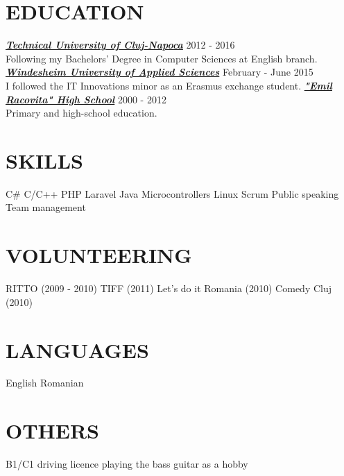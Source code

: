 \documentclass[line,margin]{res}
\begin{document}
\begin{resume}
\section{\color{section} EDUCATION}
\justify
{\color{headings}\large \sl \textbf{\href{http://www.utcluj.ro/}{Technical University of Cluj-Napoca}}} {\scriptsize 2012 - 2016} \\
Following my Bachelors' Degree in Computer Sciences at English branch.
\vspace{0.2cm}
\newline
{\color{headings}\large \sl \textbf{\href{http://www.windesheiminternational.nl/}{Windesheim University of Applied Sciences}}} {\scriptsize February - June 2015} \\
I followed the IT Innovations minor as an Erasmus exchange student.
\vspace{0.2cm}
\newline
{\color{headings}\large \sl \textbf{\href{http://ler.ubbcluj.ro/}{"Emil Racovita" High School}}} {\scriptsize 2000 - 2012} \\
Primary and high-school education.

\section{\color{section} SKILLS}
\justify
C\# \textbullet \hspace{0.1cm} 
C/C++ \textbullet \hspace{0.1cm} 
PHP \textbullet \hspace{0.1cm} 
Laravel \textbullet \hspace{0.1cm}
Java \textbullet \hspace{0.1cm}
Microcontrollers \textbullet \hspace{0.1cm}
Linux \textbullet \hspace{0.1cm}
Scrum \textbullet \hspace{0.1cm}
Public speaking \textbullet \hspace{0.1cm}
Team management

\section{\color{section} VOLUNTEERING}
\justify
RITTO (2009 - 2010) \textbullet \hspace{0.1cm}
TIFF (2011) \textbullet \hspace{0.1cm}
Let's do it Romania (2010) \textbullet \hspace{0.1cm}
Comedy Cluj (2010)

\section{\color{section} LANGUAGES}
\justify
English \textbullet \hspace{0.1cm} 
Romanian

\section{\color{section} OTHERS}
\justify
B1/C1 driving licence \textbullet \hspace{0.1cm} 
playing the bass guitar as a hobby

\end{resume}
\end{document}
